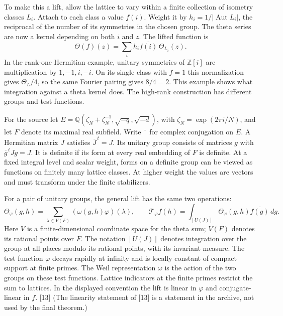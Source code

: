 \documentclass[11pt,letterpaper]{article}
\begin{document}
{To make this a lift, allow the lattice to vary within a finite collection of isometry classes $L_i$. Attach to each class a value $f(i)$. Weight it by $h_i=1/|\operatorname{Aut}L_i|$, the reciprocal of the number of its symmetries in the chosen group. The theta series are now a kernel depending on both $i$ and $z$. The lifted function is
\begin{equation}\label{D:78}
 \Theta(f)(z)=\sum_i h_i\overline{f(i)}\,\Theta_{L_i}(z).
\end{equation}
In the rank-one Hermitian example, unitary symmetries of $\mathbb Z[i]$ are multiplication by $1,-1,i,-i$. On its single class with $f=1$ this normalization gives $\Theta_L/4$, so the same Fourier pairing gives $8/4=2$. This example shows what integration against a theta kernel does. The high-rank construction has different groups and test functions.

For the source let $E=\mathbb Q(\zeta_N+\zeta_N^{-1},\sqrt{-q},\sqrt{-d})$, with $\zeta_N=\exp(2\pi i/N)$, and let $F$ denote its maximal real subfield. Write $\overline{\phantom{a}}$ for complex conjugation on $E$. A Hermitian matrix $J$ satisfies $\overline J^{\,t}=J$. Its unitary group consists of matrices $g$ with $\overline g^{\,t}Jg=J$. It is definite if its form at every real embedding of $F$ is definite. At a fixed integral level and scalar weight, forms on a definite group can be viewed as functions on finitely many lattice classes. At higher weight the values are vectors and must transform under the finite stabilizers.

For a pair of unitary groups, the general lift has the same two operations:
\begin{equation}\label{D:79}
 \Theta_\varphi(g,h)=\sum_{\lambda\in V(F)}(\omega(g,h)\varphi)(\lambda),
 \qquad
 \mathcal T_\varphi f(h)=\int_{[U(J)]}\Theta_\varphi(g,h)\overline{f(g)}\,dg.
\end{equation}
Here $V$ is a finite-dimensional coordinate space for the theta sum; $V(F)$ denotes its rational points over $F$. The notation $[U(J)]$ denotes integration over the group at all places modulo its rational points, with its invariant measure. The test function $\varphi$ decays rapidly at infinity and is locally constant of compact support at finite primes. The Weil representation $\omega$ is the action of the two groups on these test functions. Lattice indicators at the finite primes restrict the sum to lattices. In the displayed convention the lift is linear in $\varphi$ and conjugate-linear in $f$. [13] (The linearity statement of [13] is a statement in the archive, not used by the final theorem.)

}
\end{document}
